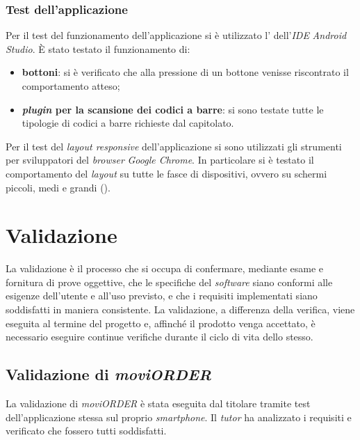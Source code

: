 \subsubsection{Test dell'applicazione}

Per il test del funzionamento dell'applicazione si è utilizzato l' dell'\textit{IDE} \textit{Android Studio}. È stato testato il funzionamento di:
\begin{itemize}
	\item \textbf{bottoni}: si è verificato che alla pressione di un bottone venisse riscontrato il comportamento atteso;
	\item \textbf{\textit{plugin} per la scansione dei codici a barre}: si sono testate tutte le tipologie di codici a barre richieste dal capitolato.
\end{itemize}

Per il test del \textit{layout responsive} dell'applicazione si sono utilizzati gli strumenti per sviluppatori del \textit{browser} \textit{Google Chrome}. In particolare si è testato il comportamento del \textit{layout} su tutte le fasce di dispositivi, ovvero su schermi piccoli, medi e grandi ().

\section{Validazione}

La validazione è il processo che si occupa di confermare, mediante esame e fornitura di prove oggettive, che le specifiche del \textit{software} siano conformi alle esigenze dell'utente e all'uso previsto, e che i requisiti implementati siano soddisfatti in maniera consistente.
La validazione, a differenza della verifica, viene eseguita al termine del progetto e, affinché il prodotto venga accettato, è necessario eseguire continue verifiche durante il ciclo di vita dello stesso.

\subsection{Validazione di \textit{moviORDER}}

La validazione di \textit{moviORDER} è stata eseguita dal titolare tramite test dell'applicazione stessa sul proprio \textit{smartphone}. Il \textit{tutor} ha analizzato i requisiti e verificato che fossero tutti soddisfatti.